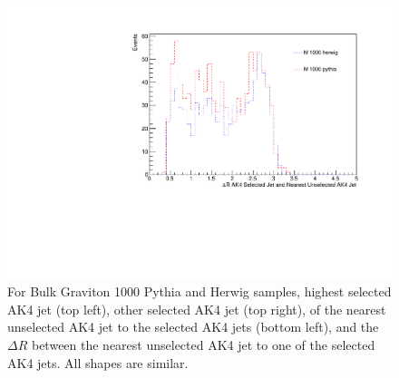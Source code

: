 \begin{figure}[thb!]
\begin{center}
\includegraphics[scale=0.34]{Figures/newcutdRsnAK4cl.pdf}
\end{center}
\caption{For Bulk Graviton 1000 Pythia and Herwig samples, highest \pt selected AK4 jet \pt (top left), other selected AK4 jet \pt (top right), \pt of the nearest unselected AK4 jet to the selected AK4 jets (bottom left), and the $\Delta R$ between the nearest unselected AK4 jet to one of the selected AK4 jets. All shapes are similar.}
\label{fig:PHother}
\end{figure} 




